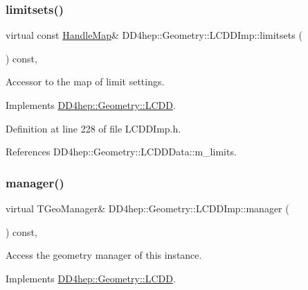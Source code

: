 \subsubsection{\texorpdfstring{limitsets()}{limitsets()}}
{\footnotesize\ttfamily virtual const \hyperlink{class_d_d4hep_1_1_geometry_1_1_l_c_d_d_a05cb11e7355772c7b0794bcca59bf477}{Handle\+Map}\& D\+D4hep\+::\+Geometry\+::\+L\+C\+D\+D\+Imp\+::limitsets (\begin{DoxyParamCaption}{ }\end{DoxyParamCaption}) const\hspace{0.3cm}{\ttfamily [inline]}, {\ttfamily [virtual]}}



Accessor to the map of limit settings. 



Implements \hyperlink{class_d_d4hep_1_1_geometry_1_1_l_c_d_d_aeacdfb972606fef31bc1b69e6e982956}{D\+D4hep\+::\+Geometry\+::\+L\+C\+DD}.



Definition at line 228 of file L\+C\+D\+D\+Imp.\+h.



References D\+D4hep\+::\+Geometry\+::\+L\+C\+D\+D\+Data\+::m\+\_\+limits.

\hypertarget{class_d_d4hep_1_1_geometry_1_1_l_c_d_d_imp_af8feecb8dfc2acc870c2882d5a0463a4}{}\label{class_d_d4hep_1_1_geometry_1_1_l_c_d_d_imp_af8feecb8dfc2acc870c2882d5a0463a4} 
\subsubsection{\texorpdfstring{manager()}{manager()}}
{\footnotesize\ttfamily virtual T\+Geo\+Manager\& D\+D4hep\+::\+Geometry\+::\+L\+C\+D\+D\+Imp\+::manager (\begin{DoxyParamCaption}{ }\end{DoxyParamCaption}) const\hspace{0.3cm}{\ttfamily [inline]}, {\ttfamily [virtual]}}



Access the geometry manager of this instance. 



Implements \hyperlink{class_d_d4hep_1_1_geometry_1_1_l_c_d_d_af209f1ecaad7336e14ffee002215aa93}{D\+D4hep\+::\+Geometry\+::\+L\+C\+DD}.



